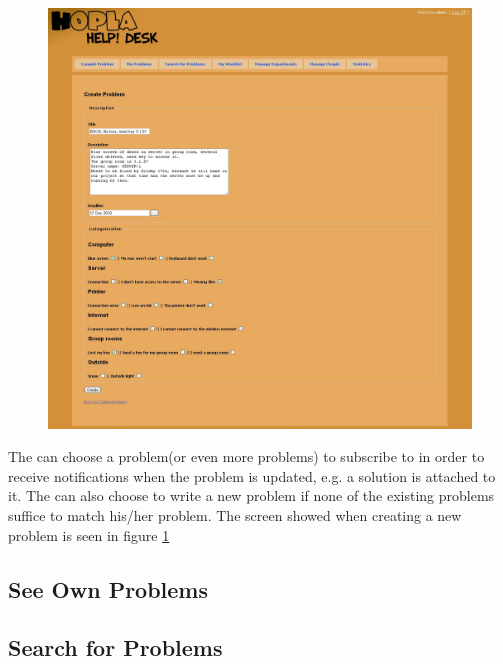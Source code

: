 \begin{figure}[htb]
	\centering
		\includegraphics[width=1.00\textwidth, clip=true, trim=2.9cm 0.5cm 10cm 8cm]{input/implementation/program_presentation/newProblem.png}
	\label{fig:newProblem}
\end{figure}
The \aclient[] can choose a problem(or even more problems) to subscribe to in order to receive notifications when the problem is updated, e.g. a solution is attached to it.
The \aclient[] can also choose to write a new problem if none of the existing problems suffice to match his/her problem.
The screen showed when creating a new problem is seen in figure \ref{fig:newProblem}

\subsection{See Own Problems}


\subsection{Search for Problems}